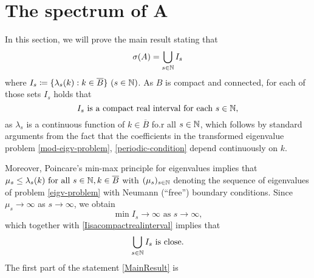 \chapter{The spectrum of A}	\label{chap4}

In this section, we will prove the main result stating that
	\begin{equation}
		\sigma(A) = \bigcup_{s \in \mathbb{N}} I_{s} \label{MainResult}
	\end{equation}
where $I_{s} \coloneqq \{ \lambda_{s}(k) : k \in \overline{B} \} ~(s \in \mathbb{N})$. As $B$ is compact and connected, for each of those sets $I_{s}$ holds that
	\begin{equation}
		I_{s} \text{ is a compact real interval for each } s \in \mathbb{N},\label{Iisacompactrealinterval}
	\end{equation} 
as $\lambda_{s}$ is a continuous function of $k \in \overline{B}$ fo.r all $s \in \mathbb{N}$, which follows by standard arguments from the fact that the coefficients in the transformed eigenvalue problem \eqref{mod-eigv-problem},  \eqref{periodic-condition} depend continuously on $k$.

	Moreover, Poincare's min-max principle for eigenvalues implies that $\mu_{s} \leq \lambda_{s}(k) \text{ for all } s \in \mathbb{N}, k \in \overline{B}$ with $(\mu_{s})_{s \in \mathbb{N}}$ denoting the sequence of eigenvalues of problem \eqref{eigv-problem} with Neumann (``free'') boundary conditions. Since $\mu_{s} \rightarrow \infty$ as $s \rightarrow \infty$, we obtain 
		\[ \min I_{s} \rightarrow \infty \text{ as } s \rightarrow \infty, \]
	which together with \eqref{Iisacompactrealinterval} implies that
		\begin{equation}
			\bigcup_{s \in \mathbb{N}} I_{s} \text{ is close.} \label{UIclosed}
		\end{equation} 
	The first part of the statement \eqref{MainResult} is 

